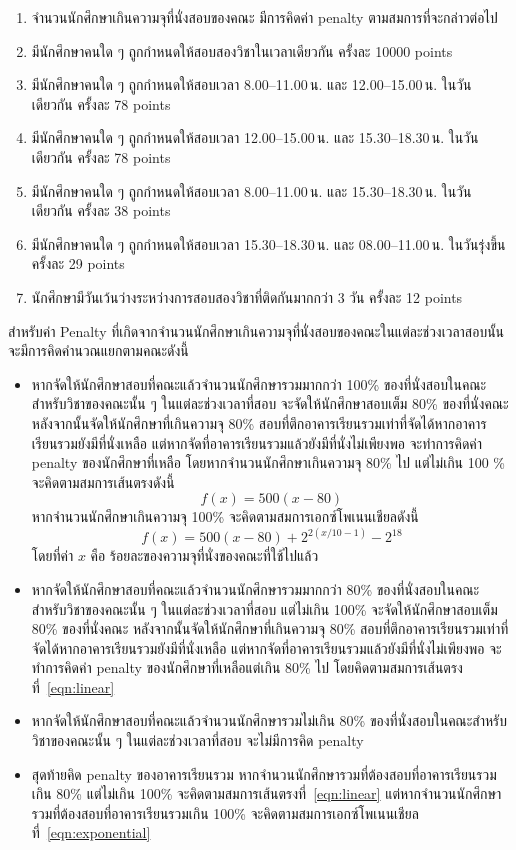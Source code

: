 \begin{enumerate}
    \item จํานวนนักศึกษาเกินความจุที่นั่งสอบของคณะ มีการคิดค่า penalty ตามสมการที่จะกล่าวต่อไป
    \item มีนักศึกษาคนใด ๆ ถูกกำหนดให้สอบสองวิชาในเวลาเดียวกัน ครั้งละ 10000 points
    \item มีนักศึกษาคนใด ๆ ถูกกำหนดให้สอบเวลา 8.00--11.00\,น. และ 12.00--15.00\,น. ในวันเดียวกัน ครั้งละ 78 points
    \item มีนักศึกษาคนใด ๆ ถูกกำหนดให้สอบเวลา 12.00--15.00\,น. และ 15.30--18.30\,น. ในวันเดียวกัน ครั้งละ 78 points
    \item มีนักศึกษาคนใด ๆ ถูกกำหนดให้สอบเวลา 8.00--11.00\,น. และ 15.30--18.30\,น. ในวันเดียวกัน ครั้งละ 38 points
    \item มีนักศึกษาคนใด ๆ ถูกกำหนดให้สอบเวลา 15.30--18.30\,น. และ 08.00--11.00\,น. ในวันรุ่งขึ้น ครั้งละ 29 points
    \item นักศึกษามีวันเว้นว่างระหว่างการสอบสองวิชาที่ติดกันมากกว่า 3 วัน ครั้งละ 12 points
\end{enumerate}
สำหรับค่า Penalty ที่เกิดจากจำนวนนักศึกษาเกินความจุที่นั่งสอบของคณะในแต่ละช่วงเวลาสอบนั้นจะมีการคิดคำนวณแยกตามคณะดังนี้
\begin{itemize}
    \item หากจัดให้นักศึกษาสอบที่คณะแล้วจำนวนนักศึกษารวมมากกว่า 100\% ของที่นั่งสอบในคณะสำหรับวิชาของคณะนั้น ๆ ในแต่ละช่วงเวลาที่สอบ จะจัดให้นักศึกษาสอบเต็ม 80\% ของที่นั่งคณะ
    หลังจากนั้นจัดให้นักศึกษาที่เกินความจุ 80\% สอบที่ตึกอาคารเรียนรวมเท่าที่จัดได้หากอาคารเรียนรวมยังมีที่นั่งเหลือ แต่หากจัดที่อาคารเรียนรวมแล้วยังมีที่นั่งไม่เพียงพอ จะทำการคิดค่า penalty ของนักศึกษาที่เหลือ
    โดยหากจำนวนนักศึกษาเกินความจุ 80\% ไป แต่ไม่เกิน 100 \% จะคิดตามสมการเส้นตรงดังนี้ 
    \begin{equation}
    \label{eqn:linear}
        f(x)=500(x-80)
    \end{equation}
    หากจำนวนนักศึกษาเกินความจุ 100\% จะคิดตามสมการเอกซ์โพเนนเชียลดังนี้ 
    \begin{equation}
    \label{eqn:exponential}
        f(x)=500(x-80)+2^{2(x/10-1)}-2^{18}
    \end{equation}
    โดยที่ค่า $x$ คือ ร้อยละของความจุที่นั่งของคณะที่ใช้ไปแล้ว
    \item หากจัดให้นักศึกษาสอบที่คณะแล้วจำนวนนักศึกษารวมมากกว่า 80\% ของที่นั่งสอบในคณะสำหรับวิชาของคณะนั้น ๆ ในแต่ละช่วงเวลาที่สอบ แต่ไม่เกิน 100\% จะจัดให้นักศึกษาสอบเต็ม 80\% ของที่นั่งคณะ
    หลังจากนั้นจัดให้นักศึกษาที่เกินความจุ 80\% สอบที่ตึกอาคารเรียนรวมเท่าที่จัดได้หากอาคารเรียนรวมยังมีที่นั่งเหลือ แต่หากจัดที่อาคารเรียนรวมแล้วยังมีที่นั่งไม่เพียงพอ จะทำการคิดค่า penalty ของนักศึกษาที่เหลือแต่เกิน 80\% ไป
    โดยคิดตามสมการเส้นตรงที่~\ref{eqn:linear}
    \item หากจัดให้นักศึกษาสอบที่คณะแล้วจำนวนนักศึกษารวมไม่เกิน 80\% ของที่นั่งสอบในคณะสำหรับวิชาของคณะนั้น ๆ ในแต่ละช่วงเวลาที่สอบ จะไม่มีการคิด penalty
    \item สุดท้ายคิด penalty ของอาคารเรียนรวม หากจำนวนนักศึกษารวมที่ต้องสอบที่อาคารเรียนรวมเกิน 80\% แต่ไม่เกิน 100\% จะคิดตามสมการเส้นตรงที่~\ref{eqn:linear} แต่หากจำนวนนักศึกษารวมที่ต้องสอบที่อาคารเรียนรวมเกิน 100\% จะคิดตามสมการเอกซ์โพเนนเชียลที่~\ref{eqn:exponential}
\end{itemize}
